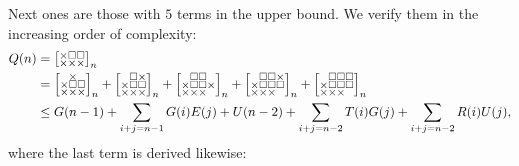 \documentclass[a4paper,12pt]{article}
\makeatletter
\newenvironment{grid}
  {\begingroup\footnotesize
   \renewcommand{\arraystretch}{0}
   \setlength{\arraycolsep}{0pt}
   \left[\begin{array}{@{}*{10}{c}@{}}}
  {\end{array}\right]\endgroup}
\newcommand{\void}{\phantom{\times}}
\newcommand{\myQ}{
    \begin{grid}
        \times & \square & \square \\
        \times & \times & \times
    \end{grid}
}
\makeatother
\begin{document}
	Next ones are those with $5$ terms in the upper bound. We verify them in the increasing order of complexity:
	\begin{align*}
		Q(n) &= \myQ_n \\
        &= \begin{grid}
        \void & \times & \void \\
        \times & \square & \square \\
        \times & \times & \times
    \end{grid}_n + \begin{grid}
        \void & \square & \times \\
        \times & \square & \square \\
        \times & \times & \times
    \end{grid}_n + \begin{grid}
			\void & \square & \square & \void \\
			\times & \square & \square & \times \\
			\times & \times & \times & \void
    \end{grid}_n + \begin{grid}
			\void & \square & \square & \times \\
			\times & \square & \square & \square \\
			\times & \times & \times & \void
    \end{grid}_n + \begin{grid}
			\void & \square & \square & \square\\
			\times & \square & \square & \square\\
			\times & \times & \times & \void
    \end{grid}_n \\
		&\le G(n-1)
	      + \sum_{i+j=n-1} G(i)E(j)
	      + U(n-2)
	      + \sum_{i+j=n-2} T(i)G(j)
	      + \sum_{i+j=n-2} R(i)U(j),
    \end{align*}
    where the last term is derived likewise:
\end{document}
